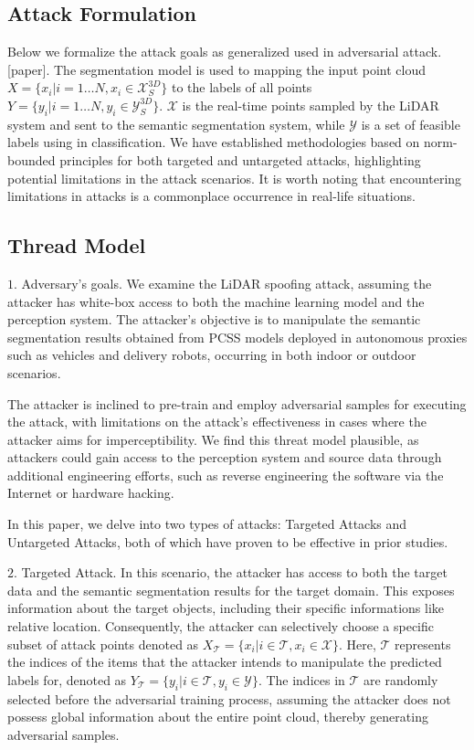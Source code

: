 \documentclass[conference]{IEEEtran}
\begin{document}
\subsection{Attack Formulation}
Below we formalize the attack goals as generalized used in adversarial attack.[paper]. The segmentation model is used to mapping the input point cloud $X=\{x_i|i=1{\ldots}N,x_i\in\mathcal{X}_S^{3D}\}$ to the labels of all points $Y=\{y_i|i=1{\ldots}N,y_i\in \mathcal{Y}_S^{3D}\}$. $\mathcal{X}$ is the real-time points  sampled by the LiDAR system and sent to the semantic segmentation system, while $\mathcal{Y}$ is a set of feasible labels using in classification. We have established methodologies based on norm-bounded principles for both targeted and untargeted attacks, highlighting potential limitations in the attack scenarios. It is worth noting that encountering limitations in attacks is a commonplace occurrence in real-life situations.

\subsection{Thread Model}
$1$. Adversary's goals. We examine the LiDAR spoofing attack, assuming the attacker has white-box access to both the machine learning model and the perception system. The attacker's objective is to manipulate the semantic segmentation results obtained from PCSS models deployed in autonomous proxies such as vehicles and delivery robots, occurring in both indoor or outdoor scenarios.

The attacker is inclined to pre-train and employ adversarial samples for executing the attack, with limitations on the attack's effectiveness in cases where the attacker aims for imperceptibility. We find this threat model plausible, as attackers could gain access to the perception system and source data through additional engineering efforts, such as reverse engineering the software via the Internet or hardware hacking.

In this paper, we delve into two types of attacks: Targeted Attacks and Untargeted Attacks, both of which have proven to be effective in prior studies. 

$2$. Targeted Attack. In this scenario, the attacker has access to both the target data and the semantic segmentation results for the target domain. This exposes information about the target objects, including their specific informations like relative location. Consequently, the attacker can selectively choose a specific subset of attack points denoted as $X_{\mathcal{T}}=\{x_{i}|i\in{\mathcal{T}},x_{i}\in \mathcal{X}\}$. Here, $\mathcal{T}$ represents the indices of the items that the attacker intends to manipulate the predicted labels for, denoted as $Y_\mathcal{T}=\{y_i|i\in \mathcal{T},y_i\in{\mathcal{Y}}\}$. The indices in $\mathcal{T}$ are randomly selected before the adversarial training process, assuming the attacker does not possess global information about the entire point cloud, thereby generating adversarial samples.
\end{document}
